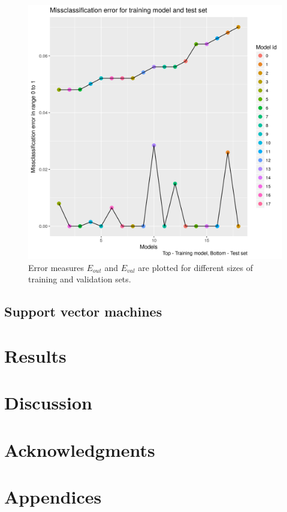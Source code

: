 \documentclass{article}
\begin{document}
\begin{figure}[H]
    \centering
        \includegraphics[width =.9\linewidth]{../R_scripts/Neural_Networks/results_NN/per_class_error.png}
    \caption{Error measures $E_{out}$ and $E_{val}$ are plotted for different sizes of training and validation sets.}
  \label{plot:1ii}
\end{figure}


\subsection{Support vector machines}

\section{Results}

\section{Discussion}

\section{Acknowledgments}

\section{Appendices}
\end{document}
